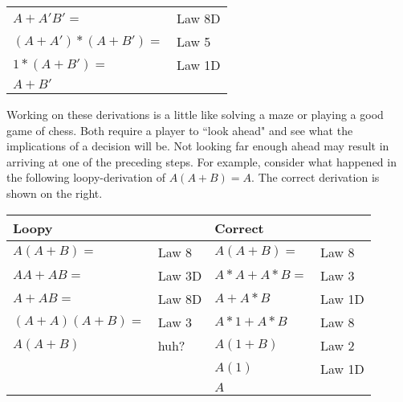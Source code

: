 \begin{tabular}[ht]{ll}
$A + A'B' =$		& Law 8D \\
$(A+A')*(A+B')=$	& Law 5 \\
$1*(A+B')=$ 		& Law 1D \\
$A+B'$ \\
\end{tabular}

Working on these derivations is a little like solving a maze or playing
a good game of chess.  Both require a player to ``look ahead" and see what the 
implications of a decision will be.  Not looking far enough ahead may
result in arriving at one of the preceding steps.  For example, consider what 
happened in the following loopy-derivation of $A(A+B)=A$.  The correct 
derivation is shown on the right.

\begin{tabular}[ht]{ll|ll}
Loopy		&		& Correct	&		\\ \hline
$A(A+B)=$ 	& Law 8	& $A(A+B)=$ & Law 8	\\ 
$AA + AB=$ 	& Law 3D	& $A*A+A*B=$& Law 3	\\ 
$A+AB=$	& Law 8D	& $A+A*B$ 	& Law 1D	\\ 
$(A+A)(A+B)=$& Law 3	& $A*1+A*B$	& Law 8	\\ 
$A(A+B)$	& huh?	& $A(1+B)$	& Law 2	\\
		&		& $A(1)$	& Law 1D	\\
		&		& $A$		& \\
\end{tabular}

